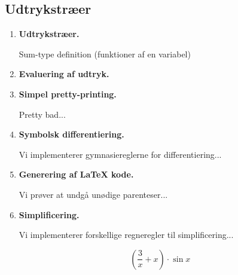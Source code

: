 \documentclass[rgb]{beamer}
\begin{document}
\subsection{Udtrykstræer}

\begin{frame}[fragile]
\begin{footnotesize}


  \vspace{1ex}

  \begin{minipage}{.6\textwidth}
  \begin{enumerate}
  \item \textbf{Udtrykstræer.}

    Sum-type definition (funktioner af en variabel)

  \item \textbf{Evaluering af udtryk.}

  \item \textbf{Simpel pretty-printing.}

    Pretty bad...

  \item \textbf{Symbolsk differentiering.}

    Vi implementerer gymnasiereglerne for differentiering...

  \item \textbf{Generering af \LaTeX{} kode.}

    Vi prøver at undgå unødige parenteser...

  \item \textbf{Simplificering.}

    Vi implementerer forskellige regneregler til simplificering...

  \end{enumerate}
  \end{minipage}\begin{minipage}{.25\textwidth}
{\large
    $$~~~~~\left(\frac{3}{x} + x\right) \cdot \sin x$$}
    \end{minipage}

\end{footnotesize}
\end{frame}
\end{document}

